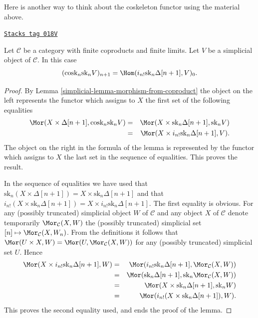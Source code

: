 Here is another way to think about the coskeleton functor
using the material above.

\begin{lemma}
\label{simplicial-lemma-cosk-shriek}
\href{https://stacks.math.columbia.edu/tag/018V}{\texttt{Stacks tag 018V}}

Let $\mathcal{C}$ be a category with finite coproducts
and finite limits. Let $V$ be a simplicial object of $\mathcal{C}$.
In this case
$$
(\text{cosk}_n \text{sk}_n V)_{n + 1}
=
\Hom(i_{n !}\text{sk}_n \Delta[n + 1], V)_0.
$$
\end{lemma}

\begin{proof}

By Lemma \ref{simplicial-lemma-morphism-from-coproduct}
the object on the left represents the functor
which assigns to $X$ the first set of the following
equalities
\begin{eqnarray*}
\Mor(X \times \Delta[n + 1], \text{cosk}_n \text{sk}_n V)
& = &
\Mor(X \times \text{sk}_n \Delta[n + 1], \text{sk}_n V) \\
& = &
\Mor(X \times i_{n !} \text{sk}_n \Delta[n + 1], V).
\end{eqnarray*}
The object on the right in the formula of the lemma
is represented by the functor which assigns to $X$
the last set in the sequence of equalities.
This proves the result.

\medskip\noindent
In the sequence of equalities we have used that
$\text{sk}_n (X \times \Delta[n + 1]) = X \times \text{sk}_n \Delta[n + 1]$
and that
$i_{n!}(X \times \text{sk}_n \Delta[n + 1]) =
X \times i_{n !} \text{sk}_n \Delta[n + 1]$.
The first equality is obvious. For any (possibly truncated)
simplicial object $W$
of $\mathcal{C}$ and any object $X$ of $\mathcal{C}$
denote temporarily $\Mor_\mathcal{C}(X, W)$ the
(possibly truncated) simplicial set
$[n] \mapsto \Mor_\mathcal{C}(X, W_n)$. From the definitions
it follows that $\Mor(U \times X, W) =
\Mor(U, \Mor_\mathcal{C}(X, W))$ for any
(possibly truncated) simplicial set $U$. Hence
\begin{eqnarray*}
\Mor(X \times i_{n !} \text{sk}_n \Delta[n + 1], W)
& = &
\Mor(i_{n !} \text{sk}_n \Delta[n + 1], \Mor_\mathcal{C}(X, W)) \\
& = &
\Mor(\text{sk}_n \Delta[n + 1],
\text{sk}_n\Mor_\mathcal{C}(X, W)) \\
& = &
\Mor(X \times \text{sk}_n \Delta[n + 1], \text{sk}_nW) \\
& = &
\Mor(i_{n!}(X \times \text{sk}_n \Delta[n + 1]), W).
\end{eqnarray*}
This proves the second equality used, and ends the proof of the lemma.
\end{proof}

